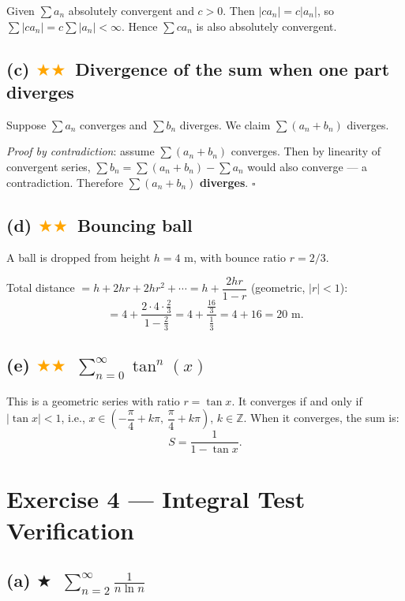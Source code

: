 \documentclass[12pt,a4paper]{article}
\newcommand{\easy}{\textcolor{green!60!black}{$\bigstar$}}
\newcommand{\medium}{\textcolor{orange}{$\bigstar\bigstar$}}
\begin{document}
Given $\sum a_n$ absolutely convergent and $c > 0$. Then $|ca_n| = c|a_n|$, so
$\sum |ca_n| = c\sum |a_n| < \infty$. Hence $\sum ca_n$ is also absolutely convergent.

\subsection*{(c) \medium\ Divergence of the sum when one part diverges}

Suppose $\sum a_n$ converges and $\sum b_n$ diverges. We claim $\sum (a_n + b_n)$ diverges.

\textit{Proof by contradiction}: assume $\sum(a_n+b_n)$ converges. Then by linearity of convergent series,
$\sum b_n = \sum(a_n+b_n) - \sum a_n$ would also converge — a contradiction.
Therefore $\sum(a_n+b_n)$ \textbf{diverges}. $\square$

\subsection*{(d) \medium\ Bouncing ball}

A ball is dropped from height $h = 4$ m, with bounce ratio $r = 2/3$.

Total distance $= h + 2h r + 2h r^2 + \cdots = h + \dfrac{2hr}{1-r}$ (geometric, $|r|<1$):
\[
  = 4 + \frac{2\cdot4\cdot\tfrac{2}{3}}{1-\tfrac{2}{3}}
  = 4 + \frac{\tfrac{16}{3}}{\tfrac{1}{3}}
  = 4 + 16 = \boxed{20 \text{ m}}.
\]

\subsection*{(e) \medium\ $\displaystyle\sum_{n=0}^{\infty}\tan^n(x)$}

This is a geometric series with ratio $r = \tan x$.  It converges if and only if $|\tan x| < 1$, i.e.,
$x \in \left(-\dfrac{\pi}{4}+k\pi,\,\dfrac{\pi}{4}+k\pi\right)$, $k\in\mathbb{Z}$.
When it converges, the sum is:
\[
  S = \frac{1}{1-\tan x}.
\]

\section*{Exercise 4 — Integral Test Verification}

\subsection*{(a) \easy\ $\displaystyle\sum_{n=2}^{\infty}\frac{1}{n\ln n}$}
\end{document}
